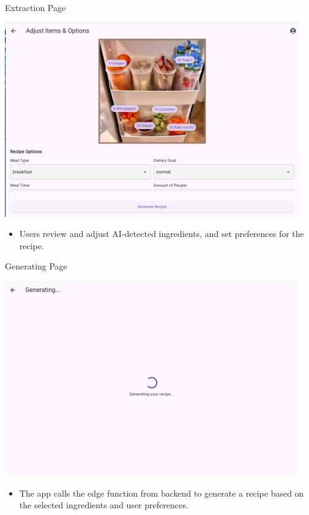 \documentclass{beamer}
\begin{document}
\begin{frame}{Extraction Page}
    \begin{center}
        \includegraphics[width=0.95\textwidth,height=0.58\textheight,keepaspectratio]{extraction_page.png}
    \end{center}
    \vspace{2mm}
    \begin{itemize}
        \item \small Users review and adjust AI-detected ingredients, and set preferences for the recipe.
    \end{itemize}
\end{frame}

\begin{frame}{Generating Page}
    \begin{center}
        \includegraphics[width=0.95\textwidth,height=0.58\textheight,keepaspectratio]{generating_page.png}
    \end{center}
    \vspace{2mm}
    \begin{itemize}
        \item \small The app calls the edge function from backend to generate a recipe based on the selected ingredients and user preferences.
    \end{itemize}
\end{frame}
\end{document}

